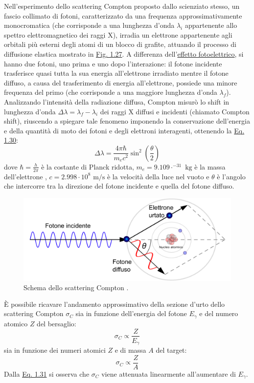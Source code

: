 \documentclass[12pt,a4paper,twoside]{report}
\begin{document}
	Nell'esperimento dello scattering Compton proposto dallo scienziato stesso, un fascio collimato di fotoni, caratterizzato da una frequenza approssimativamente monocromatica (che corrisponde a una lunghezza d'onda $\lambda_i$ appartenente allo spettro elettromagnetico dei raggi X), irradia un elettrone appartenente agli orbitali più esterni degli atomi di un blocco di grafite, attuando il processo di diffusione elastica mostrato in \hyperref[fig:compton]{Fig. 1.27}. A differenza dell'\hyperref[par:effetto_fotoelettrico]{effetto fotoelettrico}, si hanno due fotoni, uno prima e uno dopo l'interazione: il fotone incidente trasferisce quasi tutta la sua energia all'elettrone irradiato mentre il fotone diffuso, a causa del trasferimento di energia all'elettrone, possiede una minore frequenza del primo (che corrisponde a una maggiore lunghezza d'onda $\lambda_f$). Analizzando l'intensità della radiazione diffusa, Compton misurò lo shift in lunghezza d'onda $\Delta \lambda=\lambda_f-\lambda_i$ dei raggi X diffusi e incidenti (chiamato Compton shift), riuscendo a spiegare tale fenomeno imponendo la conservazione dell'energia e della quantità di moto dei fotoni e degli elettroni interagenti, ottenendo la \hyperref[eq:compton]{Eq. 1.30}:
	\begin{equation}
		\Delta \lambda=\frac{4\pi\hbar}{m_ec^2}\sin^2{\left(\frac{\theta}{2}\right)}
		\label{eq:compton}
	\end{equation}
	dove $\hbar=\frac{h}{2\pi}$ è la costante di Planck ridotta, $m_e=9.109\cdot^{-31}\mbox{ kg}$ è la massa dell'elettrone \cite{electronMass}, $c=2.998\cdot10^{8}\mbox{ m/s}$ è la velocità della luce nel vuoto \cite{soliv} e $\theta$ è l'angolo che intercorre tra la direzione del fotone incidente e quella del fotone diffuso.
	\begin{figure}[H]
		\centering
		\includegraphics[width=0.9\linewidth]{compton.pdf}
		\caption{Schema dello scattering Compton \cite{comptScatt}.}
		\label{fig:compton}
	\end{figure}
	\`E possibile ricavare l'andamento approssimativo della sezione d'urto dello scattering Compton $\sigma_{C}$ sia in funzione dell'energia del fotone $E_\gamma$ e del numero atomico $Z$ del bersaglio:
	\begin{equation}
		\sigma_{C}\propto \frac{Z}{E_\gamma}
		\label{eq:sigma_c1}
	\end{equation}
	sia in funzione dei numeri atomici $Z$ e di massa $A$ del target:
	\begin{equation}
		\sigma_{C}\propto \frac{Z}{A}
		\label{eq:sigma_c2}
	\end{equation}
	Dalla \hyperref[eq:sigma_c1]{Eq. 1.31} si osserva che $\sigma_{C}$ viene attenuata linearmente all'aumentare di $E_\gamma$.
	
\end{document}
